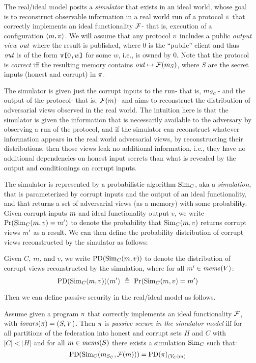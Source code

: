The real/ideal model posits a \emph{simulator} that exists in an ideal
world, whose goal is to reconstruct observable information in a real
world run of a protocol $\pi$ that correctly implements an ideal
functionality $\mathcal{F}$- that is, execution of a configuration
$\langle m,\pi \rangle$. We will assume that any protocol $\pi$
includes a public \emph{output view} $\mathit{out}$ where the result is
published, where $0$ is the ``public'' client and thus $\mathit{out}$
is of the form $\texttt{v[}0\texttt{,}w\texttt{]}$ for some $w$, i.e., is owned by 0.
Note that the protocol is \emph{correct} iff the resulting
memory contains $\mathit{out} \mapsto \mathcal{F}(m_S)$, where $S$ are the
secret inputs (honest and corrupt) in $\pi$.

The simulator is given just the corrupt inputs to the run- that is,
$m_{S_C}$- and the output of the protocol- that is,
$\mathcal{F}(m)$- and aims to reconstruct the distribution of
adversarial views observed in the real world. The intuition here is
that the simulator is given the information that is necessarily
available to the adversary by observing a run of the protocol, and if
the simulator can reconstruct whatever information appears in the real
world adversarial views, by reconstructing their distributions, then
those views leak no additional information, i.e., they have no
additional dependencies on honest input secrets than what is revealed
by the output and conditionings on corrupt inputs.

The simulator is represented by a probabilistic algorithm $\mathrm{Sim}_C$,
aka a \emph{simulation}, that is parameterized by corrupt inputs and
the output of an ideal functionality, and that returns a set of
adversarial views (as a memory) with some probability. Given
corrupt inputs $m$ and ideal functionality output $v$,  
we write
$
\mathrm{Pr}(\mathrm{Sim}_C(m,v) = m')
$
to denote the probability that $\mathrm{Sim}_C(m,v)$
returns corrupt views $m'$ as a result. We can then define the
probability distribution of corrupt views reconstructed
by the simulator as follows:
\begin{definition}
  Given $C$, $m$, and $v$, we write $\mathrm{PD}(\mathrm{Sim}_C(m,v))$ to
  denote the distribution of corrupt views reconstructed by the
  simulation, where for
  all $m' \in \mathit{mems}(V)$:
  $$
  \progd(\SIM_C(\store,v))(\store')\ \defeq\ \prob(\SIM_C(\store,v) = \store') 
  $$
\end{definition}

Then we can define passive security in the real/ideal
model as follows. 
\begin{definition}
  Assume given a program $\pi$ that correctly implements an ideal
  functionality $\mathcal{F}$, with $\mathit{iovars}(\pi) = (S,V)$.  Then $\pi$
  is \emph{passive secure in the simulator model} iff for all
  partitions of the federation into honest and corrupt sets $H$ and $C$
  with $|C| < |H|$ and for all $m \in \mathit{mems}(S)$ there exists a
  simulation $\mathrm{Sim}_C$ such that:
  $$
  \mathrm{PD}(\mathrm{Sim}_C(m_{S_C},\mathcal{F}(m))) = \mathrm{PD}(\pi)_{({V_C}|{m})}
  $$
\end{definition}

